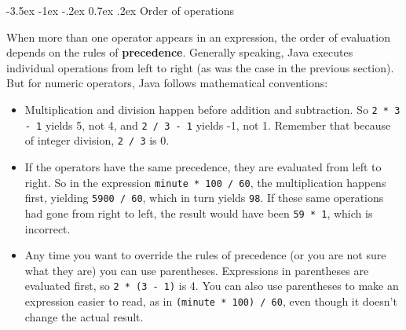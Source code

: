 \documentclass[12pt]{book}
\makeatletter
\theoremstyle{exercise}
\newcommand{\java}[1]{\verb"#1"}
\renewcommand{\section}{\@startsection{section}{1}{\z@}%
    {-3.5ex \@plus -1ex \@minus -.2ex}%
    {0.7ex \@plus.2ex}%
    {\normalfont\Large\bfseries}}
\newcommand{\java}[1]{\lstinline{#1}} %
\makeatother
\begin{document}



\section{Order of operations}


When more than one operator appears in an expression, the order of evaluation depends on the rules of {\bf precedence}.
Generally speaking, Java executes individual operations from left to right (as was the case in the previous section).
But for numeric operators, Java follows mathematical conventions:

\begin{itemize}

\item Multiplication and division happen before addition and subtraction.
So \java{2 * 3 - 1} yields 5, not 4, and \java{2 / 3 - 1} yields -1, not 1.
Remember that because of integer division, \java{2 / 3} is 0.

\item If the operators have the same precedence, they are evaluated from left to right.
So in the expression \java{minute * 100 / 60}, the multiplication happens first, yielding \java{5900 / 60}, which in turn yields \java{98}.
If these same operations had gone from right to left, the result would have been \java{59 * 1}, which is incorrect.

\item Any time you want to override the rules of precedence (or you are not sure what they are) you can use parentheses.
Expressions in parentheses are evaluated first, so \java{2 * (3 - 1)} is 4.
You can also use parentheses to make an expression easier to read, as in \java{(minute * 100) / 60}, even though it doesn't change the actual result.

\end{itemize}
\end{document}
